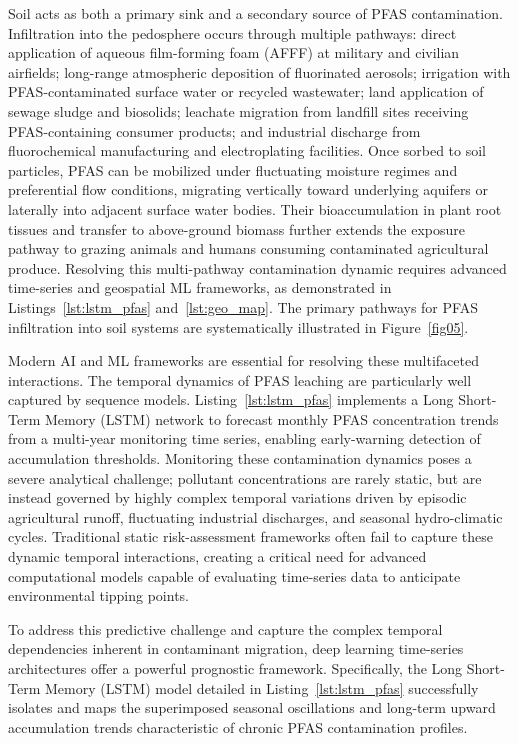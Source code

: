 \documentclass[environremediat,article,accept,pdftex,oneauthor]{Definitions/mdpi}
\begin{document}
{Soil acts as both a primary sink and a secondary source of PFAS
contamination. Infiltration into the pedosphere occurs through
multiple pathways: direct application of aqueous film-forming foam
(AFFF) at military and civilian airfields; long-range atmospheric
deposition of fluorinated aerosols; irrigation with PFAS-contaminated
surface water or recycled wastewater; land application of sewage
sludge and biosolids; leachate migration from landfill sites receiving
PFAS-containing consumer products; and industrial discharge from
fluorochemical manufacturing and electroplating facilities}. Once
sorbed to soil particles, PFAS can be mobilized under fluctuating
moisture regimes and preferential flow conditions, migrating
vertically toward underlying aquifers or laterally into adjacent
surface water bodies. {Their bioaccumulation in plant root tissues and
transfer to above-ground biomass further extends the exposure pathway
to grazing animals and humans consuming contaminated agricultural
produce.} Resolving this multi-pathway contamination dynamic requires
advanced time-series and geospatial ML frameworks, as demonstrated in
Listings~\ref{lst:lstm_pfas} and~\ref{lst:geo_map}. The primary
pathways for PFAS infiltration into soil systems are systematically
illustrated in Figure~\ref{fig05}.

Modern %
 AI and ML frameworks
are essential for resolving these multifaceted interactions. The temporal
dynamics of PFAS leaching are particularly well captured by sequence models.
Listing~\ref{lst:lstm_pfas} implements a Long Short-Term Memory (LSTM) network
to forecast monthly PFAS concentration trends from a multi-year monitoring
time series, enabling early-warning detection of accumulation thresholds. Monitoring these contamination dynamics poses a severe analytical challenge; pollutant concentrations are rarely static, but are instead governed by highly complex temporal variations driven by episodic agricultural runoff, fluctuating industrial discharges, and seasonal hydro-climatic cycles. Traditional static risk-assessment frameworks often fail to capture these dynamic temporal interactions, creating a critical need for advanced computational models capable of evaluating time-series data to anticipate environmental tipping points.

To address this predictive challenge and capture the complex temporal dependencies inherent in contaminant migration, deep learning time-series architectures offer a powerful prognostic framework. Specifically, the Long Short-Term Memory (LSTM) model detailed in Listing~\ref{lst:lstm_pfas} successfully isolates and maps the superimposed seasonal oscillations and long-term upward accumulation trends characteristic of chronic PFAS contamination profiles. 
\end{document}
